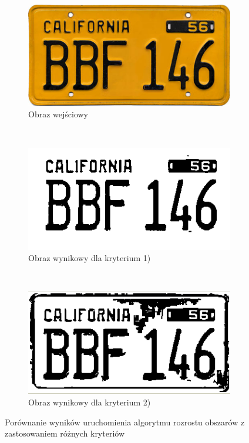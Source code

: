 \begin{figure}
  \centering
  \begin{subfigure}[b]{0.45\textwidth}
    \includegraphics[width=\textwidth]{img/region-growing-input}
    \caption{Obraz wejściowy}
    \label{fig:region_growing_input}
  \end{subfigure}
  ~
  \begin{subfigure}[b]{0.45\textwidth}
    \includegraphics[width=\textwidth]{img/region-growing-relative}
    \caption{Obraz wynikowy dla kryterium 1)}
    \label{fig:region_growing_relative}
  \end{subfigure}
  ~
  \begin{subfigure}[b]{0.45\textwidth}
    \includegraphics[width=\textwidth]{img/region-growing-absolute}
    \caption{Obraz wynikowy dla kryterium 2)}
    \label{fig:region_growing_absolute}
  \end{subfigure}
  \caption{Porównanie wyników uruchomienia algorytmu rozrostu obszarów z zastosowaniem różnych kryteriów}
    \label{fig:region_growing}
\end{figure}

